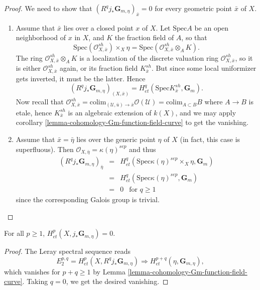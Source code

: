 \begin{proof}
We need to show that $(R^q j_*\mathbf{G}_{m,\eta})_{\bar x} = 0$ for every
geometric point $\bar x$ of $X$.
\begin{enumerate}
\item
Assume that $\bar x$ lies over a closed point $x$ of $X$. Let $\text{Spec} A$
be an open neighborhood of $x$ in $X$, and $K$ the fraction field of $A$, so
that
$$
\text{Spec}(\mathcal{O}^{sh}_{X,\bar x}) \times_X \eta =
\text{Spec}(\mathcal{O}^{sh}_{X,\bar x} \otimes_A K).
$$
The ring $\mathcal{O}^{sh}_{X,\bar x} \otimes_A K$ is a localization of
the discrete valuation ring $\mathcal{O}^{sh}_{X,\bar x}$, so it is either
$\mathcal{O}^{sh}_{X,\bar x}$ again, or its fraction field
$K^{sh}_{\bar x}$. But since some local uniformizer gets inverted, it must
be the latter. Hence
$$
(R^q j_*\mathbf{G}_{m,\eta})_{(X, \bar x)} = H_{et}^q(\text{Spec}
K^{sh}_{\bar x}, \mathbf{G}_m).
$$
Now recall that $\mathcal{O}^{sh}_{X, \bar x} =
\text{colim}_{(\mathcal{U},\bar u) \to \bar x} \mathcal{O} (\mathcal{U}) =
\text{colim}_{A \subset B} B$ where $A \to B$ is etale, hence
$K^{sh}_{\bar x}$ is an algebraic extension of $k(X)$, and we may apply
corollary \ref{lemma-cohomology-Gm-function-field-curve} to get the vanishing.
\item
Assume that $\bar x = \bar \eta$ lies over the generic point $\eta$ of $X$ (in
fact, this case is superfluous). Then $\mathcal{O}_{X,\bar \eta} =
\kappa(\eta)^{sep}$ and thus
\begin{eqnarray*}
(R^q j_*\mathbf{G}_{m,\eta})_{\bar \eta}
& = &
H_{et}^q(\text{Spec} \kappa(\eta)^{sep} \times_X \eta, \mathbf{G}_m) \\
& = & H_{et}^q (\text{Spec} \kappa(\eta)^{sep}, \mathbf{G}_m) \\
& = & 0 \ \ \text{ for } q \geq 1
\end{eqnarray*}
since the corresponding Galois group is trivial.
\end{enumerate}
\end{proof}

\begin{lemma}
\label{lemma-cohomology-jstar-Gm}
For all $p \geq 1$, $H_{et}^p(X, j_*\mathbf{G}_{m,\eta}) = 0$.
\end{lemma}

\begin{proof}
The Leray spectral sequence reads
$$
E_2^{p,q} = H_{et}^p(X, R^qj_*\mathbf{G}_{m,\eta}) \Rightarrow
H_{et}^{p+q}(\eta, \mathbf{G}_{m,\eta}),
$$
which vanishes for $p+q \geq 1$ by
Lemma \ref{lemma-cohomology-Gm-function-field-curve}. Taking
$q = 0$, we get the desired vanishing.
\end{proof}

